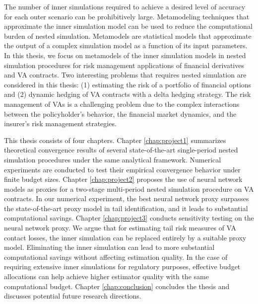 The number of inner simulations required to achieve a desired level of accuracy for each outer scenario can be prohibitively large.
Metamodeling techniques that approximate the inner simulation model can be used to reduce the computational burden of nested simulation.
Metamodels are statistical models that approximate the output of a complex simulation model as a function of its input parameters.
In this thesis, we focus on metamodels of the inner simulation models in nested simulation procedures for risk management applications of financial derivatives and VA contracts.
Two interesting problems that requires nested simulation are considered in this thesis: (1) estimating the risk of a portfolio of financial options and (2) dynamic hedging of VA contracts with a delta hedging strategy.
The risk management of VAs is a challenging problem due to the complex interactions between the policyholder's behavior, the financial market dynamics, and the insurer's risk management strategies.

This thesis consists of four chapters. Chapter \ref{chap:project1} summarizes theoretical convergence results of several state-of-the-art single-period nested simulation procedures under the same analytical framework. Numerical experiments are conducted to test their empirical convergence behavior under finite budget sizes.
Chapter \ref{chap:project2} proposes the use of neural network models as proxies for a two-stage multi-period nested simulation procedure on VA contracts. 
In our numerical experiment, the best neural network proxy surpasses the state-of-the-art proxy model in tail identification, and it leads to substantial computational savings. 
Chapter \ref{chap:project3} conducts sensitivity testing on the neural network proxy. We argue that for estimating tail risk measures of VA contact losses, the inner simulation can be replaced entirely by a suitable proxy model. 
Eliminating the inner simulation can lead to more substantial computational savings without affecting estimation quality. 
In the case of requiring extensive inner simulations for regulatory purposes, effective budget allocations can help achieve higher estimator quality with the same computational budget.
Chapter \ref{chap:conclusion} concludes the thesis and discusses potential future research directions.

